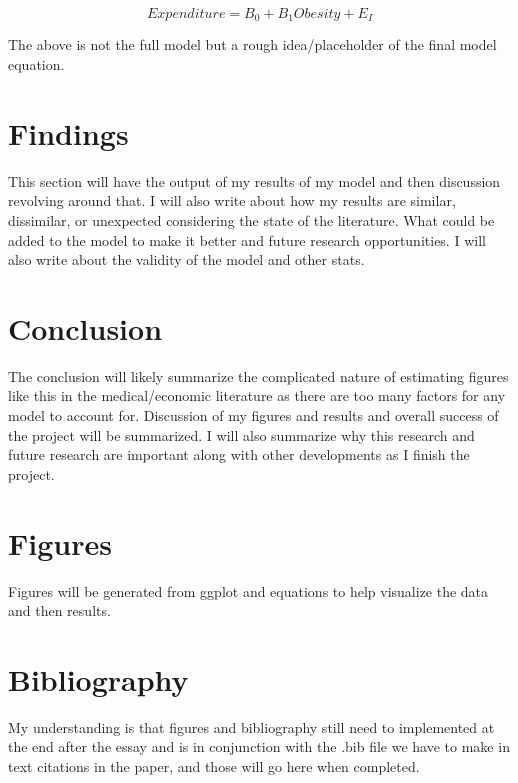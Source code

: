 \documentclass{article}
\begin{document}
\begin{equation}
    Expenditure = B_0 + B_1Obesity + E_I
\end{equation}

The above is not the full model but a rough idea/placeholder of the final model equation.


\section{Findings}

This section will have the output of my results of my model and then discussion revolving around that. I will also write about how my results are similar, dissimilar, or unexpected considering the state of the literature. What could be added to the model to make it better and future research opportunities. I will also write about the validity of the model and other stats.

\section{Conclusion}

The conclusion will likely summarize the complicated nature of estimating figures like this in the medical/economic literature as there are too many factors for any model to account for. Discussion of my figures and results and overall success of the project will be summarized. I will also summarize why this research and future research are important along with other developments as I finish the project.
\section{Figures}

Figures will be generated from ggplot and equations to help visualize the data and then results.

\section{Bibliography}

My understanding is that figures and bibliography still need to implemented at the end after the essay and is in conjunction with the .bib file we have to make in text citations in the paper, and those will go here when completed.
\end{document}
